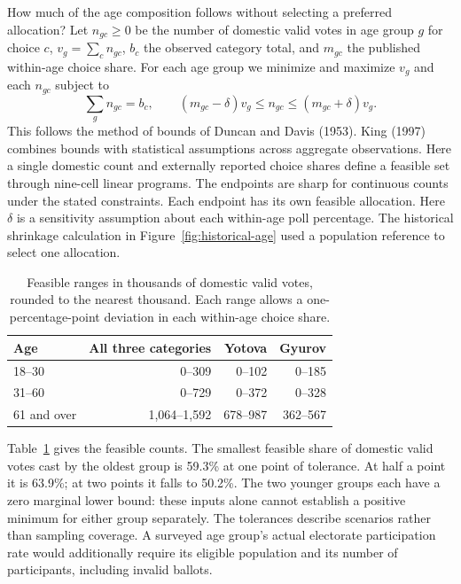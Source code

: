 \documentclass[11pt,a4paper]{article}
\begin{document}
How much of the age composition follows without selecting a preferred allocation? Let $n_{gc}\geq0$ be the number of domestic valid votes in age group $g$ for choice $c$, $v_g=\sum_c n_{gc}$, $b_c$ the observed category total, and $m_{gc}$ the published within-age choice share. For each age group we minimize and maximize $v_g$ and each $n_{gc}$ subject to
\[
 \sum_g n_{gc}=b_c,\qquad
 (m_{gc}-\delta)v_g\le n_{gc}\le(m_{gc}+\delta)v_g .
\]
This follows the method of bounds of Duncan and Davis (1953). King (1997) combines bounds with statistical assumptions across aggregate observations. Here a single domestic count and externally reported choice shares define a feasible set through nine-cell linear programs. The endpoints are sharp for continuous counts under the stated constraints. Each endpoint has its own feasible allocation. Here $\delta$ is a sensitivity assumption about each within-age poll percentage. The historical shrinkage calculation in Figure~\ref{fig:historical-age} used a population reference to select one allocation.

\begin{table}[!htbp]\centering
\begin{tabular}{lrrr}\toprule
Age & All three categories & Yotova & Gyurov\\\midrule
18--30 & 0--309 & 0--102 & 0--185\\
31--60 & 0--729 & 0--372 & 0--328\\
61 and over & 1,064--1,592 & 678--987 & 362--567\\\bottomrule
\end{tabular}

\caption{Feasible ranges in thousands of domestic valid votes, rounded to the nearest thousand. Each range allows a one-percentage-point deviation in each within-age choice share.}\label{tab:age-bounds}
\end{table}
Table~\ref{tab:age-bounds} gives the feasible counts. The smallest feasible share of domestic valid votes cast by the oldest group is 59.3\% at one point of tolerance. At half a point it is 63.9\%; at two points it falls to 50.2\%. The two younger groups each have a zero marginal lower bound: these inputs alone cannot establish a positive minimum for either group separately. The tolerances describe scenarios rather than sampling coverage. A surveyed age group's actual electorate participation rate would additionally require its eligible population and its number of participants, including invalid ballots.
\end{document}

